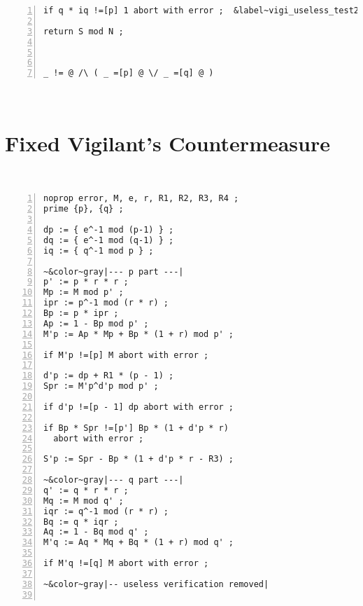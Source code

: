\documentclass[10pt]{article}
\theoremstyle{definition}
\theoremstyle{theorem}
\begin{document}
\begin{minipage}[c]{\textwidth}
\begin{minipage}[c]{0.42\textwidth}
\begin{minipage}[c]{\linewidth}
\begin{minipage}[c]{0.85\linewidth}
{\begin{Verbatim}[commandchars=&~|,numbers=left]
if q * iq !=[p] 1 abort with error ;  &label~vigi_useless_test2|

return S mod N ;



_ != @ /\ ( _ =[p] @ \/ _ =[q] @ )
\end{Verbatim}
}
\end{minipage}
\end{minipage}

\end{minipage} \begin{minipage}[c]{0.05\textwidth} ~ \end{minipage} \begin{minipage}[c]{0.42\textwidth} 

\section{Fixed Vigilant's Countermeasure}
\label{app-vigilant-fixed}

\begin{minipage}[c]{\linewidth}
\begin{minipage}[c]{0.1\linewidth}
~
\end{minipage}
\begin{minipage}[c]{0.85\linewidth}
{\smaller
\begin{Verbatim}[commandchars=&~|,numbers=left]
noprop error, M, e, r, R1, R2, R3, R4 ;
prime {p}, {q} ;

dp := { e^-1 mod (p-1) } ;
dq := { e^-1 mod (q-1) } ;
iq := { q^-1 mod p } ;

~&color~gray|--- p part ---|
p' := p * r * r ;
Mp := M mod p' ;
ipr := p^-1 mod (r * r) ;
Bp := p * ipr ;
Ap := 1 - Bp mod p' ;
M'p := Ap * Mp + Bp * (1 + r) mod p' ;

if M'p !=[p] M abort with error ;

d'p := dp + R1 * (p - 1) ;
Spr := M'p^d'p mod p' ;

if d'p !=[p - 1] dp abort with error ;

if Bp * Spr !=[p'] Bp * (1 + d'p * r)
  abort with error ;

S'p := Spr - Bp * (1 + d'p * r - R3) ;

~&color~gray|--- q part ---|
q' := q * r * r ;
Mq := M mod q' ;
iqr := q^-1 mod (r * r) ;
Bq := q * iqr ;
Aq := 1 - Bq mod q' ;
M'q := Aq * Mq + Bq * (1 + r) mod q' ;

if M'q !=[q] M abort with error ;

~&color~gray|-- useless verification removed|


\end{Verbatim}}
\end{minipage}
\end{minipage}
\end{minipage}
\end{minipage}
\end{document}

